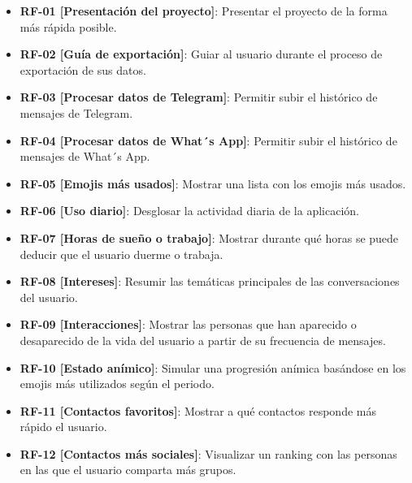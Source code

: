 
\begin{itemize}
    \item \textbf{RF-01 [Presentación del proyecto]}: Presentar el proyecto de la forma más rápida posible.
    \item \textbf{RF-02 [Guía de exportación]}: Guiar al usuario durante el proceso de exportación de sus datos.
    \item \textbf{RF-03 [Procesar datos de Telegram]}: Permitir subir el histórico de mensajes de Telegram.
    \item \textbf{RF-04 [Procesar datos de What´s App]}: Permitir subir el histórico de mensajes de What´s App.
    \item \textbf{RF-05 [Emojis más usados]}: Mostrar una lista con los emojis más usados.
    \item \textbf{RF-06 [Uso diario]}: Desglosar la actividad diaria de la aplicación.
    \item \textbf{RF-07 [Horas de sueño o trabajo]}: Mostrar durante qué horas se puede deducir que el usuario duerme o trabaja.
    \item \textbf{RF-08 [Intereses]}: Resumir las temáticas principales de las conversaciones del usuario.
    \item \textbf{RF-09 [Interacciones]}: Mostrar las personas que han aparecido o desaparecido de la vida del usuario a partir de su frecuencia de mensajes.
    \item \textbf{RF-10 [Estado anímico]}: Simular una progresión anímica basándose en los emojis más utilizados según el periodo.
    \item \textbf{RF-11 [Contactos favoritos]}: Mostrar a qué contactos responde más rápido el usuario.
    \item \textbf{RF-12 [Contactos más sociales]}: Visualizar un ranking con las personas en las que el usuario comparta más grupos.
\end{itemize}
